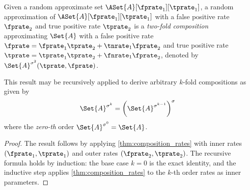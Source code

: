 \begin{theorem}
\label{thm:twofold_composition}
	Given a random approximate set $\ASet{A}[\fprate_1][\tprate_1]$, a random approximation of $\ASet{A}[\fprate_1][\tprate_1]$ with a false positive rate $\fprate_2$ and true positive rate $\tprate_2$ is a \emph{two-fold composition} approximating $\Set{A}$ with a false positive rate $\fprate = \fprate_1 \tprate_2 + \tnrate_1 \fprate_2$ and true positive rate $\tprate = \tprate_1 \tprate_2 + \fnrate_1 \fprate_2$, denoted by $\Set{A}^{\sigma^2}(\tprate,\fprate)$.

	This result may be recursively applied to derive arbitrary $k$-fold compositions as given by
	\begin{equation}
		\Set{A}^{\sigma^k} = \left(\Set{A}^{\sigma^{k-1}}\right)^{\sigma}
	\end{equation}
	where the \emph{zero-th} order $\Set{A}^{\sigma^0} = \Set{A}$.
\end{theorem}
\begin{proof}
The result follows by applying \cref{thm:composition_rates} with inner
rates $(\fprate_1, \tprate_1)$ and outer rates $(\fprate_2, \tprate_2)$.
The recursive formula holds by induction: the base case $k = 0$ is the
exact identity, and the inductive step applies \cref{thm:composition_rates}
to the $k$-th order rates as inner parameters.
\end{proof}

